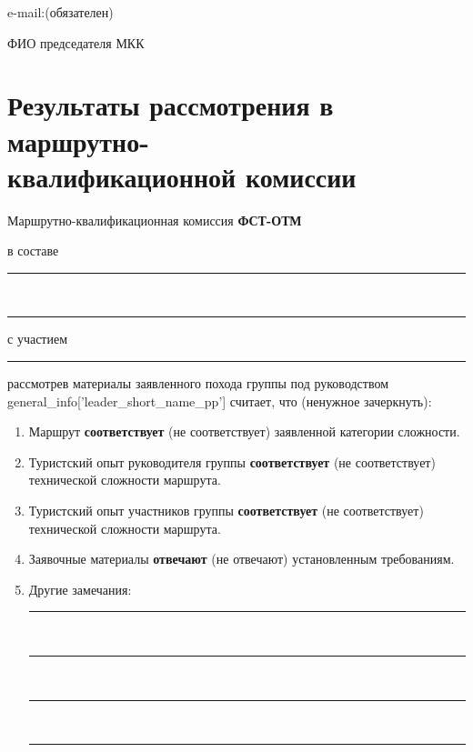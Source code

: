\documentclass[a5paper, 12pt, twoside]{article}
\begin{document}
        e-mail:\;\hrulefill\;(обязателен)
        \vspace{0.5cm}
        
        ФИО председателя МКК\;\hrulefill\,

\newpage %

    \section[]{Результаты рассмотрения в маршрутно-\\квалификационной комиссии}

        Маршрутно-квалификационная комиссия \textbf{ФСТ-ОТМ}
        
        в составе\;\leaders\hrule height 0.2pt\hfill\strut
        \vspace{0.2cm}
        
        \,\leaders\hrule height 0.2pt\hfill\strut
        \vspace{0.2cm}
        
        с участием\;\leaders\hrule height 0.2pt\hfill\strut
        \vspace{0.1cm}
        
        рассмотрев материалы заявленного похода группы под руководством {{general_info['leader_short_name_pp']}} считает, что (ненужное зачеркнуть):

        \begin{enumerate}
            \item Маршрут \textbf{соответствует} (не соответствует) заявленной категории сложности.
            \item Туристский опыт руководителя группы \textbf{соответствует} (не соответствует) технической сложности маршрута.
            \item Туристский опыт участников группы \textbf{соответствует} (не соответствует) технической сложности маршрута.
            \item Заявочные материалы \textbf{отвечают} (не отвечают) установленным требованиям.
            \item Другие замечания:\;\leaders\hrule height 0.2pt\hfill\strut
            
            \,\leaders\hrule height 0.2pt\hfill\strut

            \,\leaders\hrule height 0.2pt\hfill\strut

            \,\leaders\hrule height 0.2pt\hfill\strut
        \end{enumerate}
        
\end{document}
